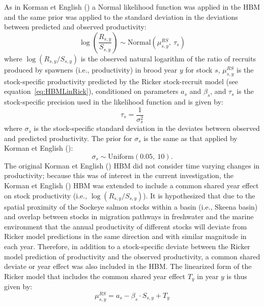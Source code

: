 \documentclass[french,11pt]{book}
\begin{document}
As in Korman et English () a Normal likelihood function was applied in the HBM and the same prior was applied to the standard deviation in the deviations between predicted and observed productivity:
\begin{equation}
  \log{\left(\frac{R_{s,y}}{S_{s,y}}\right) \sim   \textrm{Normal}\left(\mu_{s,y}^{RS},\  \tau_s \right)} 
\end{equation}
where \(\log(R_{s,y}/S_{s,y})\) is the observed natural logarithm of the ratio of recruits produced by spawners (i.e., productivity) in brood year \(y\) for stock \(s\), \(\mu_{s,y}^{RS}\) is the stock-specific productivity predicted by the Ricker stock-recruit model (see equation~\ref{eq:HBMLinRick}), conditioned on parameters \(a_s\) and \(\beta_s\), and \(\tau_s\) is the stock-specific precision used in the likelihood function and is given by:
\begin{equation}
  \tau_s=\frac{1}{\sigma_s^2}
\end{equation}
where \(\sigma_s\) is the stock-specific standard deviation in the deviates between observed and predicted productivity. The prior for \(\sigma_s\) is the same as that applied by Korman et English ():
\begin{equation}
  \sigma_s \sim \textrm{Uniform}(0.05,\ 10).
\end{equation}
The original Korman et English () HBM did not consider time varying changes in productivity; because this was of interest in the current investigation, the Korman et English () HBM was extended to include a common shared year effect on stock productivity (i.e., \(\log(R_{s,y}/S_{s,y})\)). It is hypothesized that due to the spatial proximity of the Sockeye salmon stocks within a basin (i.e., Skeena basin) and overlap between stocks in migration pathways in freshwater and the marine environment that the annual productivity of different stocks will deviate from Ricker model predictions in the same direction and with similar magnitude in each year. Therefore, in addition to a stock-specific deviate between the Ricker model prediction of productivity and the observed productivity, a common shared deviate or year effect was also included in the HBM. The linearized form of the Ricker model that includes the common shared year effect \(T_y\) in year \(y\) is thus given by:
\begin{equation}
  \mu_{s,y}^{RS}=a_s-\beta_s\cdot S_{s,y}+T_y
\end{equation}
\end{document}
